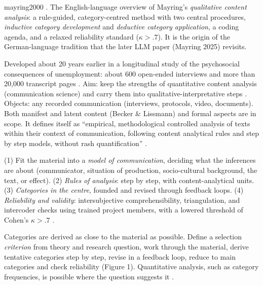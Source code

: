 \begin{papercard}{mayring2000}
   . The English-language overview of Mayring's \emph{qualitative content analysis}: a rule-guided, category-centred method with two central procedures, \emph{inductive category development} and \emph{deductive category application}, a coding agenda, and a relaxed reliability standard ($\kappa>.7$). It is the origin of the German-language tradition that the later LLM paper (Mayring 2025) revisits.

 Developed about 20 years earlier in a longitudinal study of the psychosocial consequences of unemployment: about 600 open-ended interviews and more than 20,000 transcript pages . Aim: keep the strengths of quantitative content analysis (communication science) and carry them into qualitative-interpretative steps . Objects: any recorded communication (interviews, protocols, video, documents). Both manifest and latent content (Becker \& Lissmann) and formal aspects are in scope. It defines itself as ``empirical, methodological controlled analysis of texts within their context of communication, following content analytical rules and step by step models, without rash quantification'' .

 (1) Fit the material into a \emph{model of communication}, deciding what the inferences are about (communicator, situation of production, socio-cultural background, the text, or effect). (2) \emph{Rules of analysis}: step by step, with content-analytical units. (3) \emph{Categories in the centre}, founded and revised through feedback loops. (4) \emph{Reliability and validity}: intersubjective comprehensibility, triangulation, and intercoder checks using trained project members, with a lowered threshold of Cohen's $\kappa>.7$ .

 Categories are derived as close to the material as possible. Define a selection \emph{criterion} from theory and research question, work through the material, derive tentative categories step by step, revise in a feedback loop, reduce to main categories and check reliability (Figure 1). Quantitative analysis, such as category frequencies, is possible where the question suggests it .


\end{papercard}
